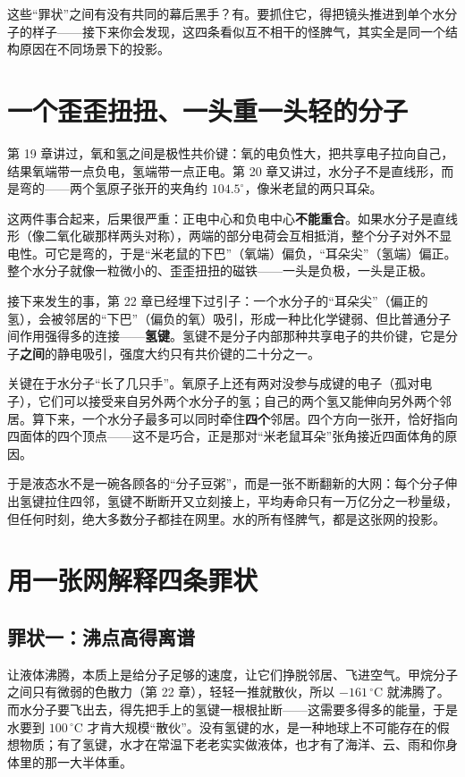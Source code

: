 这些“罪状”之间有没有共同的幕后黑手？有。要抓住它，得把镜头推进到单个水分子的样子——接下来你会发现，这四条看似互不相干的怪脾气，其实全是同一个结构原因在不同场景下的投影。

\section{一个歪歪扭扭、一头重一头轻的分子}

第 19 章讲过，氧和氢之间是极性共价键：氧的电负性大，把共享电子拉向自己，结果氧端带一点负电，氢端带一点正电。第 20 章又讲过，水分子不是直线形，而是弯的——两个氢原子张开的夹角约 $104.5^{\circ}$，像米老鼠的两只耳朵。

这两件事合起来，后果很严重：正电中心和负电中心\textbf{不能重合}。如果水分子是直线形（像二氧化碳那样两头对称），两端的部分电荷会互相抵消，整个分子对外不显电性。可它是弯的，于是“米老鼠的下巴”（氧端）偏负，“耳朵尖”（氢端）偏正。整个水分子就像一粒微小的、歪歪扭扭的磁铁——一头是负极，一头是正极。

接下来发生的事，第 22 章已经埋下过引子：一个水分子的“耳朵尖”（偏正的氢），会被邻居的“下巴”（偏负的氧）吸引，形成一种比化学键弱、但比普通分子间作用强得多的连接——\textbf{氢键}。氢键不是分子内部那种共享电子的共价键，它是分子\textbf{之间}的静电吸引，强度大约只有共价键的二十分之一。

关键在于水分子“长了几只手”。氧原子上还有两对没参与成键的电子（孤对电子），它们可以接受来自另外两个水分子的氢；自己的两个氢又能伸向另外两个邻居。算下来，一个水分子最多可以同时牵住\textbf{四个}邻居。四个方向一张开，恰好指向四面体的四个顶点——这不是巧合，正是那对“米老鼠耳朵”张角接近四面体角的原因。

于是液态水不是一碗各顾各的“分子豆粥”，而是一张不断翻新的大网：每个分子伸出氢键拉住四邻，氢键不断断开又立刻接上，平均寿命只有一万亿分之一秒量级，但任何时刻，绝大多数分子都挂在网里。水的所有怪脾气，都是这张网的投影。

\section{用一张网解释四条罪状}

\subsection{罪状一：沸点高得离谱}

让液体沸腾，本质上是给分子足够的速度，让它们挣脱邻居、飞进空气。甲烷分子之间只有微弱的色散力（第 22 章），轻轻一推就散伙，所以 $-161\,^{\circ}\mathrm{C}$ 就沸腾了。而水分子要飞出去，得先把手上的氢键一根根扯断——这需要多得多的能量，于是水要到 $100\,^{\circ}\mathrm{C}$ 才肯大规模“散伙”。没有氢键的水，是一种地球上不可能存在的假想物质；有了氢键，水才在常温下老老实实做液体，也才有了海洋、云、雨和你身体里的那一大半体重。

